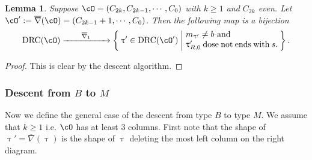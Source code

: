 \documentclass[12pt,a4paper]{amsart}
\def\eDD{\overline{\nabla}}
\def\eDDo{\overline{\nabla}_1}
\numberwithin{equation}{section}
\newtheorem{lem}[thm]{Lemma}
\theoremstyle{remark}
\def\drc{\mathrm{DRC}}
\def\cOp{\cO^{\prime}}
\def\uptaup{\uptau^{\prime}}
\begin{document}
\begin{lem}\label{lem:gd.BM}
  Suppose $\cO = (C_{2k},C_{2k-1}, \cdots, C_{0})$ with $k\geq 1$ and $C_{2k}$ even.
  Let $\cOp := \eDD(\cO)=(C_{2k-1}+1,\cdots, C_{0})$.
  Then the following map is a bijection
  \[
    \drc(\cO) \xrightarrow{\hspace{2em}\eDDo\hspace{2em}}
    \Set{\uptaup\in \drc(\cOp)| \begin{minipage}{11em}
        $m_{\uptaup}\neq b$ and\\
         $\uptaup_{R,0}$ dose not ends with $s$.
      \end{minipage}
    }. %
  \]
\end{lem}
\begin{proof}
  This is clear by the descent algorithm.
\end{proof}


\subsubsection{Descent from $B$ to $M$}
Now we define the general case of the descent from type $B$ to type $M$.
We assume that $k\geq 1$ i.e. $\cO$ has at least 3 columns.
First note that the shape of $\uptau' = \eDD(\uptau)$ is the shape of $\uptau$ deleting the
most left column on the right diagram.
\end{document}
